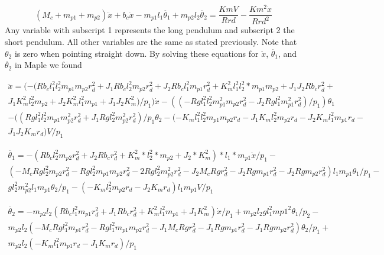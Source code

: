 \documentclass{article}
\begin{document}
\begin{equation} 
\label{eqn6th3}
(M_c+m_{p1}+m_{p2}) \ddot{x}+b_c \dot{x}-m_{p1} l_1 \ddot{\theta_1}+m_{p2} l_2 \ddot{\theta_2} = \frac{Km V}{R r d}-\frac{Km^2 \dot{x}}{R r d^2}
\end{equation}
Any variable with subscript 1 represents the long pendulum and subscript 2 the short pendulum. All other variables are the same as stated previously. Note that $\theta_2$ is zero when pointing straight down. By solving these equations for $\ddot{x}$, $\ddot{\theta_1}$, and $\ddot{\theta_2}$ in Maple we found

\begin{multline} 
\label{eqn6th4}
\ddot{x} = (-(R b_c l_1^2 l_2^2 m_{p1} m_{p2} r_d^2+J_1 R b_c l_2^2 m_{p2} r_d^2+J_2 R b_c l_1^2 m_{p1} r_d^2+K_m^2 l_1^2 l_2^2*m_{p1} m_{p2}+J_1 J_2 R b_c r_d^2+\\J_1 K_m^2 l_2^2 m_{p2}+J_2 K_m^2 l_1^2 m_{p1}+J_1 J_2 K_m^2)/p_1)\dot{x} -((-R g l_1^2 l_2^2 m_{p1}^2 m_{p2} r_d^2-J_2 R g l_1^2 m_{p1}^2 r_d^2)/p_1)\theta_1 \\-((R g l_1^2 l_2^2 m_{p1} m_{p2}^2 r_d^2+J_1 R g l_2^2 m_{p2}^2 r_d^2)/p_1 \theta_2 -(-K_m l_1^2 l_2^2 m_{p1} m_{p2} r_d-J_1 K_m l_2^2 m_{p2} r_d-J_2 K_m l_1^2 m_{p1} r_d-\\J_1 J_2 K_m r_d) V/p_1
\end{multline}

\begin{multline} 
\label{eqn6th5}
\ddot{\theta_1} = -(R b_c l_2^2 m_{p2} r_d^2+J_2 R b_c r_d^2+K_m^2*l_2^2*m_{p2}+J_2*K_m^2)*l_1*m_{p1} \dot{x}/p_1 -\\(-M_c R g l_2^2 m_{p2} r_d^2-R g l_2^2 m_{p1} m_{p2} r_d^2-2 R g l_2^2 m_{p2}^2 r_d^2-J_2 M_c R g r_d^2-J_2 R g m_{p1} r_d^2-J_2 R g m_{p2} r_d^2) l_1 m_{p1} \theta_1 /p_1-\\g l_2^2 m_{p2}^2 l_1 m_{p1} \theta_2/p_1-(-K_m l_2^2 m_{p2} r_d-J_2 K_m r_d) l_1 m_{p1} V/p_1
\end{multline}

\begin{multline} 
\label{eqn6th6}
\ddot{\theta_2} = -m_{p2} l_2 (R b_c l_1^2 m_{p1} r_d^2+J_1 R b_c r_d^2+K_m^2 l_1^2 m_{p1}+J_1 K_m^2)\dot{x}/p_1 +m_{p2} l_2 g l_1^2 m{p1}^2 \theta_1/p_2 - \\m_{p2} l_2 (-M_c R g l_1^2 m_{p1} r_d^2-R g l_1^2 m_{p1} m_{p2} r_d^2-J_1 M_c R g r_d^2-J_1 R g m_{p1} r_d^2-J_1 R g m_{p2} r_d^2) \theta_2/p_1 + \\m_{p2} l_2 (-K_m l_1^2 m_{p1} r_d-J_1 K_m r_d)/p_1
\end{multline}
\end{document}
